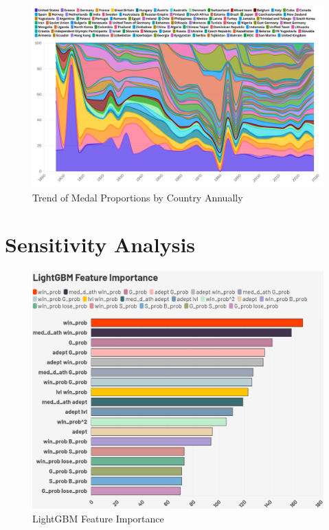 \documentclass[12pt]{article}  %
\begin{document}
\begin{figure}[htbp]
	\centering
	\includegraphics[width=16cm]{img/3.3-1.png}
	\caption{Trend of Medal Proportions by Country Annually}
	\label{fig:aa}
\end{figure}








\section{Sensitivity Analysis}

\begin{figure}[htbp]
	\centering
	\includegraphics[width=16cm]{img/Sensitive Analysis 1.png}
	\caption{LightGBM Feature Importance}
	\label{fig:aa}
\end{figure}
\end{document}
